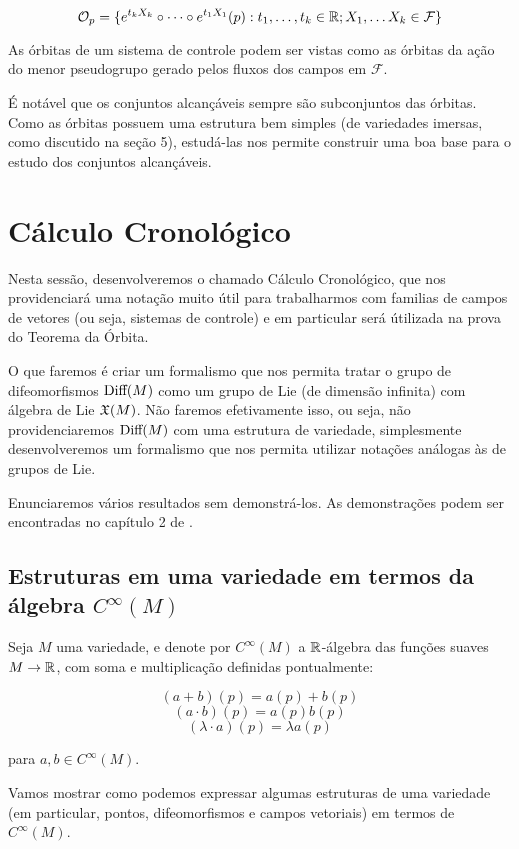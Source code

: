 $$\mathcal{O}_p = \{e^{t_kX_k} \circ \dots \circ e^{t_1X_1} (p) :
t_1, \dots, t_k \in \mathbb{R} ; X_1, \dots X_k \in \mathcal{F}\}$$

As órbitas de um sistema de controle podem ser vistas como
as órbitas da ação do menor pseudogrupo gerado pelos fluxos
dos campos em $\mathcal{F}$.

É notável que os conjuntos alcançáveis sempre são subconjuntos
das órbitas. Como as órbitas possuem uma estrutura bem simples
(de variedades imersas, como discutido na seção 5), estudá-las
nos permite construir uma boa base para o estudo dos conjuntos alcançáveis.

\section{Cálculo Cronológico}

Nesta sessão, desenvolveremos o chamado Cálculo Cronológico, que nos providenciará
uma notação muito útil para trabalharmos com familias de campos de vetores (ou seja,
sistemas de controle) e em particular será útilizada na prova do Teorema da Órbita.

O que faremos é criar um formalismo que nos permita tratar
o grupo de difeomorfismos $\text{Diff}(M)$ como um grupo de Lie
(de dimensão infinita) com álgebra de Lie
$\mathfrak{X}(M)$. Não faremos efetivamente isso, ou seja, não
providenciaremos $\text{Diff}(M)$ com uma estrutura de variedade,
simplesmente desenvolveremos um formalismo que nos permita utilizar
notações análogas às de grupos de Lie.

Enunciaremos vários resultados sem demonstrá-los. As demonstrações
podem ser encontradas no capítulo 2 de \cite{Agrachev}.

\subsection{Estruturas em uma variedade em termos da álgebra $C^\infty(M)$}

Seja $M$ uma variedade, e denote por $C^\infty(M)$ a $\mathbb{R}$-álgebra
das funções suaves $M \to \mathbb{R}$, com soma e multiplicação definidas pontualmente:

$$ (a+b)(p) = a(p) + b(p)$$
$$ (a \cdot b)(p) = a(p)b(p)$$
$$ (\lambda \cdot a)(p) = \lambda a(p)$$

para $a,b \in C^\infty(M)$.

Vamos mostrar como podemos expressar algumas estruturas
de uma variedade (em particular, pontos, difeomorfismos e campos vetoriais)
em termos de $C^\infty(M)$.

